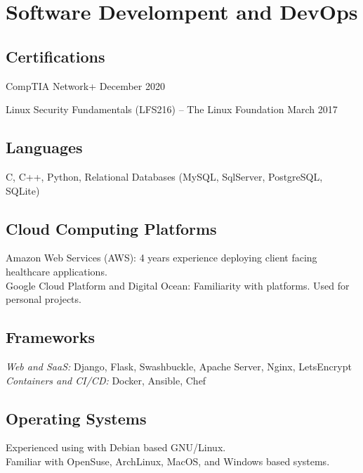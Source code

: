 \section{Software Develompent and DevOps}


\subsection{Certifications}
CompTIA Network+
    \hfill December 2020

Linux Security Fundamentals (LFS216) -- The Linux Foundation
    \hfill March 2017

\subsection{Languages}
C,
C++,
Python,
Relational Databases (MySQL, SqlServer, PostgreSQL, SQLite)

\subsection{Cloud Computing Platforms}
Amazon Web Services (AWS): 4 years experience deploying client facing healthcare applications.\\
Google Cloud Platform and Digital Ocean: Familiarity with platforms. Used for personal projects.

\subsection{Frameworks}
{\it Web and SaaS:} Django, Flask, Swashbuckle, Apache Server, Nginx, LetsEncrypt\\
{\it Containers and CI/CD:} Docker, Ansible, Chef


\subsection{Operating Systems}
Experienced using with Debian based GNU/Linux.\\
Familiar with OpenSuse, ArchLinux, MacOS, and Windows based systems.
